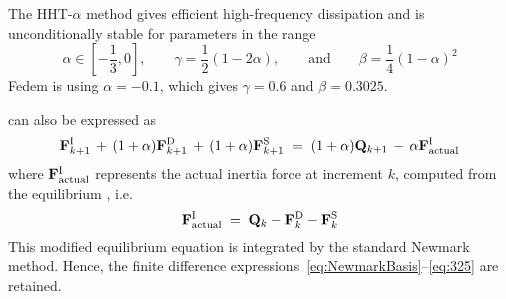 The HHT-$\alpha$ method gives efficient high-frequency dissipation and is
unconditionally stable for parameters in the range
%
\begin{equation}
\alpha \in [-\frac{1}{3},0], \qquad
\gamma = \frac{1}{2}(1-2\alpha), \qquad\text{and}\qquad
\beta = \frac{1}{4}(1-\alpha)^2
\end{equation}
%
Fedem is using $\alpha = -0.1$, which gives $\gamma = 0.6$ and $\beta = 0.3025$.


 can also be expressed as
%
\begin{equation}
\Fi_\kp1 \,+\, (1+\alpha)\Fd_\kp1 \,+\, (1+\alpha)\Fs_\kp1 \;=\;
(1+\alpha)\Q_\kp1 \,-\, \alpha\Fi_\text{actual}
\label{eq:HHTequil}
\end{equation}
%
where ${\bf F}^{\rm I}_\text{actual}$ represents the actual inertia force at increment $k$,
computed from the equilibrium , i.e.
%
\begin{equation}
{\bf F}^{\rm I}_\text{actual} \;=\; {\bf Q}_k - {\bf F}^{\rm D}_k - {\bf F}^{\rm S}_k
\end{equation}
%
This modified equilibrium equation is integrated by the standard Newmark method.
Hence, the finite difference expressions~\eqref{eq:NewmarkBasis}--\eqref{eq:325}
are retained.

